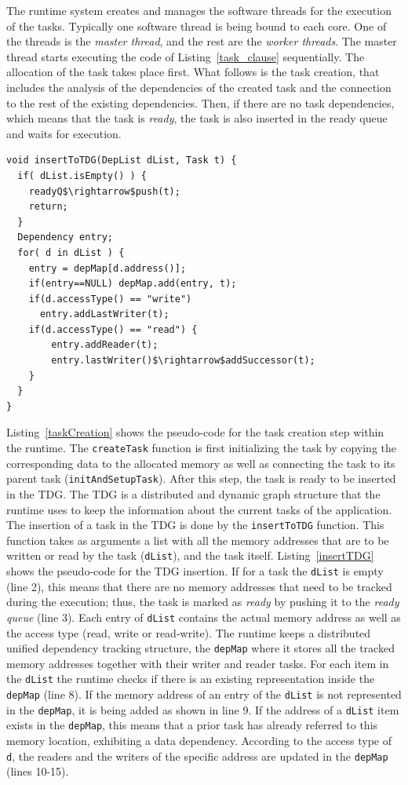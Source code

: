 The runtime system creates and manages the software threads for the execution of the tasks. 
Typically one software thread is being bound to each core. 
One of the threads is the \textit{master thread}, and the rest are the \textit{worker threads}. 
The master thread starts executing the code of Listing~\ref{task_clause} sequentially. 
The allocation of the task takes place first.
What follows is the task creation, that includes the analysis of the dependencies of the created task and the connection to the rest of the existing dependencies.
Then, if there are no task dependencies, which means that the task is \textit{ready}, the task is also inserted in the ready queue and waits for execution.
\begin{lstlisting}[float, emph={insertToTDG}, caption={Pseudo-code for TDG insertion},label=insertTDG]
void insertToTDG(DepList dList, Task t) {
  if( dList.isEmpty() ) {
    readyQ$\rightarrow$push(t);
    return;
  }
  Dependency entry;
  for( d in dList ) {
    entry = depMap[d.address()];
    if(entry==NULL) depMap.add(entry, t);
    if(d.accessType() == "write")
      entry.addLastWriter(t);
    if(d.accessType() == "read") {
        entry.addReader(t);
        entry.lastWriter()$\rightarrow$addSuccessor(t);
    }
  }
}
\end{lstlisting}
Listing~\ref{taskCreation} shows the pseudo-code for the task creation step within the runtime.
The \texttt{createTask} function is first initializing the task by copying the corresponding data to the allocated memory as well as connecting the task to its parent task (\texttt{initAndSetupTask}).
After this step, the task is ready to be inserted in the TDG. 
The TDG is a distributed and dynamic graph structure that the runtime uses to keep the information about the current tasks of the application. 
The insertion of a task in the TDG is done by the \texttt{insertToTDG} function.
This function takes as arguments a list with all the memory addresses that are to be written or read by the task (\texttt{dList}), and the task itself.
Listing~\ref{insertTDG} shows the pseudo-code for the TDG insertion. 
If for a task the \texttt{dList} is empty (line 2), this means that there are no memory addresses that need to be tracked during the execution; thus, the task is marked as \textit{ready} by pushing it to the \textit{ready queue} (line 3).
Each entry of \texttt{dList} contains the actual memory address as well as the access type (read, write or read-write).
The runtime keeps a distributed unified dependency tracking structure, the \texttt{depMap} where it stores all the tracked memory addresses together with their writer and reader tasks.
For each item in the \texttt{dList} the runtime checks if there is an existing representation inside the \texttt{depMap} (line 8).
If the memory address of an entry of the \texttt{dList} is not represented in the \texttt{depMap}, it is being added as shown in line 9.
If the address of a \texttt{dList} item exists in the \texttt{depMap}, this means that a prior task has already referred to this memory location, exhibiting a data dependency.
According to the access type of \texttt{d}, the readers and the writers of the specific address are updated in the \texttt{depMap} (lines 10-15).

